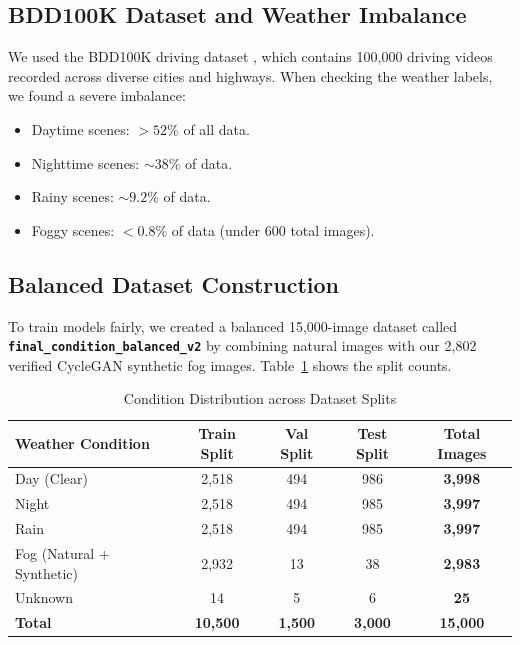 \documentclass{article}
\begin{document}
\subsection{BDD100K Dataset and Weather Imbalance}
We used the BDD100K driving dataset \cite{yu2020bdd100k}, which contains 100,000 driving videos recorded across diverse cities and highways. When checking the weather labels, we found a severe imbalance:
\begin{itemize}
    \item Daytime scenes: $>52\%$ of all data.
    \item Nighttime scenes: $\sim 38\%$ of data.
    \item Rainy scenes: $\sim 9.2\%$ of data.
    \item Foggy scenes: $<0.8\%$ of data (under 600 total images).
\end{itemize}

\subsection{Balanced Dataset Construction}
To train models fairly, we created a balanced 15,000-image dataset called \textbf{\texttt{final\_condition\_balanced\_v2}} by combining natural images with our 2,802 verified CycleGAN synthetic fog images. Table~\ref{tab:dataset_distribution} shows the split counts.

\begin{table}[!ht]
\centering
\small
\caption{Condition Distribution across Dataset Splits}
\label{tab:dataset_distribution}
\begin{tabular}{lcccc}
\toprule
\textbf{Weather Condition} & \textbf{Train Split} & \textbf{Val Split} & \textbf{Test Split} & \textbf{Total Images} \\
\midrule
Day (Clear) & 2,518 & 494 & 986 & \textbf{3,998} \\
Night & 2,518 & 494 & 985 & \textbf{3,997} \\
Rain & 2,518 & 494 & 985 & \textbf{3,997} \\
Fog (Natural + Synthetic) & 2,932 & 13 & 38 & \textbf{2,983} \\
Unknown & 14 & 5 & 6 & \textbf{25} \\
\midrule
\textbf{Total} & \textbf{10,500} & \textbf{1,500} & \textbf{3,000} & \textbf{15,000} \\
\bottomrule
\end{tabular}
\end{table}

\newpage
\end{document}
